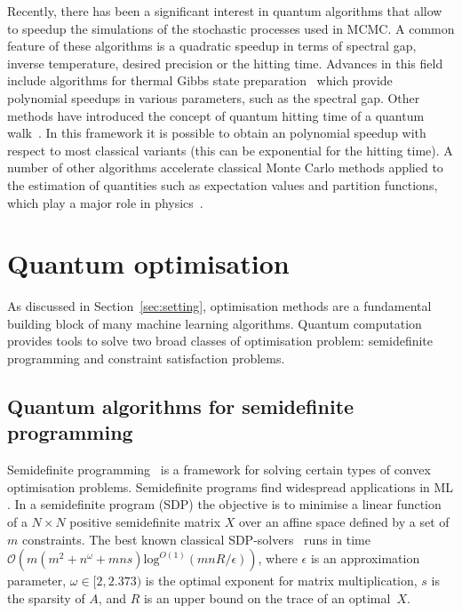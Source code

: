 \documentclass[a4paper, 11pt]{article}
\begin{document}
Recently, there has been a significant interest in quantum algorithms that allow to speedup the simulations of the stochastic processes used in MCMC. A common feature of these algorithms is a quadratic speedup in terms of spectral gap, inverse temperature, desired precision or the hitting time. Advances in this field include algorithms for thermal Gibbs state preparation~\cite{somma2008quantum,poulin2009sampling,chiang2010quantum,bilgin2010preparing,temme2011quantum,schwarz2012preparing,chowdhury2016quantum} which provide polynomial speedups in various parameters, such as the spectral gap. Other methods have introduced the concept of quantum hitting time of a quantum walk~\cite{szegedy2004quantum,ambainis2005coins,krovi2006hitting,krovi2010adiabatic,magniez2011search,chowdhury2016quantum}. In this framework it is possible to obtain an polynomial speedup with respect to most classical variants (this can be exponential for the hitting time).
A number of other algorithms accelerate classical Monte Carlo methods applied to the estimation of quantities such as expectation values and partition functions, which play a major role in physics~\cite{montanaro2016quantum,knill2007optimal,chowdhury2016quantum}.\\


\section{Quantum optimisation}
\label{sec:opt}

As discussed in Section~\ref{sec:setting}, optimisation methods are a fundamental building block of many machine learning algorithms. Quantum computation provides tools to solve two broad classes of optimisation problem: semidefinite programming and constraint satisfaction problems.

\subsection*{Quantum algorithms for semidefinite programming}

Semidefinite programming~\cite{vandenberghe1996semidefinite, grotschel2012geometric} is a framework  for solving certain types of convex optimisation problems. Semidefinite programs find widespread applications in ML \cite{lanckriet2004learning,weinberger2007graph,jacob2009group}. In a semidefinite program (SDP) the objective is to minimise a linear function of a $N \times N$ positive semidefinite matrix $X$ over an affine space defined by a set of $m$ constraints. The best known classical SDP-solvers~\cite{lee2015faster} runs in time $\mathcal{O}(m(m^2+n^\omega + mns)\mathrm{log}^{O(1)}(mnR/\epsilon))$, where $\epsilon$ is an approximation parameter, $\omega \in [2,2.373)$ is the optimal exponent for matrix multiplication, $s$ is the sparsity of $A$, and $R$ is an upper bound on the trace of an optimal~$X$.\\
\end{document}
